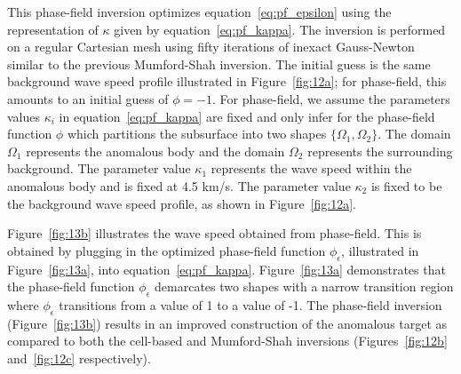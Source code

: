 \documentclass[manuscript,revised]{geophysics}
\begin{document}
This phase-field inversion optimizes equation~\ref{eq:pf_epsilon} using the representation of $\kappa$ given by equation~\ref{eq:pf_kappa}. The inversion is performed on a regular Cartesian mesh using fifty iterations of inexact Gauss-Newton similar to the previous Mumford-Shah inversion. The initial guess is the same background wave speed profile illustrated in Figure~\ref{fig:12a}; for phase-field, this amounts to an initial guess of $\phi=-1$.  For phase-field, we assume the parameters values $\kappa_i$ in equation~\ref{eq:pf_kappa} are fixed and only infer for the phase-field function $\phi$ which partitions the subsurface into two shapes $\{\Omega_1,\Omega_2 \}$. The domain $\Omega_1$ represents the anomalous body and the domain $\Omega_2$ represents the surrounding background. The parameter value $\kappa_1$ represents the wave speed within the anomalous body and is fixed at 4.5 km/s. The parameter value $\kappa_2$ is fixed to be the background wave speed profile, as shown in Figure~\ref{fig:12a}.

Figure~\ref{fig:13b} illustrates the wave speed obtained from phase-field.  This is obtained by plugging in the optimized phase-field function $\phi_\epsilon$, illustrated in Figure~\ref{fig:13a}, into equation~\ref{eq:pf_kappa}.  Figure~\ref{fig:13a} demonstrates that the phase-field function $\phi_\epsilon$ demarcates two shapes with a narrow transition region where $\phi_\epsilon$ transitions from a value of 1 to a value of -1. The phase-field inversion (Figure~\ref{fig:13b}) results in an improved construction of the anomalous target as compared to both the cell-based and Mumford-Shah inversions (Figures~\ref{fig:12b} and~\ref{fig:12c} respectively).
\end{document}
